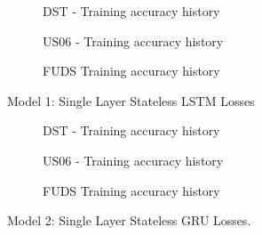 \begin{figure}[htbp]
    \centering
    \begin{subfigure}[b]{0.95\textwidth}
        \centering
        
        \caption{DST - Training accuracy history}
    \end{subfigure}
    \hfill
    \begin{subfigure}[b]{0.95\textwidth}
        \centering
        
        \caption{US06 - Training accuracy history}
    \end{subfigure}
    \hfill
    \begin{subfigure}[b]{0.95\textwidth}
        \centering
        
        \caption{FUDS Training accuracy history}
    \end{subfigure}    
    \caption{Model 1: Single Layer Stateless LSTM Losses}
    \label{fig:Model-1losses}
\end{figure}
\begin{figure}[htbp]
    \centering
    \begin{subfigure}[b]{0.95\textwidth}
        \centering
        
        \caption{DST - Training accuracy history}
    \end{subfigure}
    \hfill
    \begin{subfigure}[b]{0.95\textwidth}
        \centering
        
        \caption{US06 - Training accuracy history}
    \end{subfigure}
    \hfill
    \begin{subfigure}[b]{0.95\textwidth}
        \centering
        
        \caption{FUDS Training accuracy history}
    \end{subfigure}    
    \caption{Model 2: Single Layer Stateless GRU Losses.}
    \label{fig:Model-2losses}
\end{figure}

